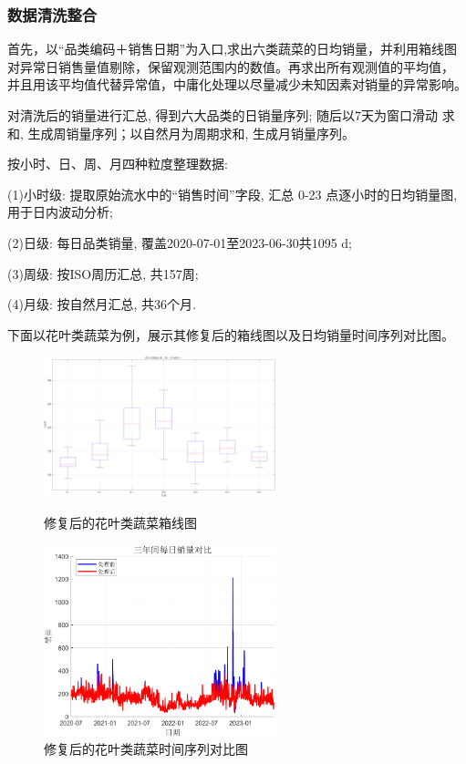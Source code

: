 \documentclass{cumcmthesis}
\begin{document}
\subsubsection{数据清洗整合}

首先，以“品类编码＋销售日期”为入口,求出六类蔬菜的日均销量，并利用箱线图
对异常日销售量值剔除，保留观测范围内的数值。再求出所有观测值的平均值，
并且用该平均值代替异常值，中庸化处理以尽量减少未知因素对销量的异常影响。

对清洗后的销量进行汇总, 得到六大品类的日销量序列; 随后以7天为窗口滑动
求和, 生成周销量序列；以自然月为周期求和, 生成月销量序列。  

按小时、日、周、月四种粒度整理数据: 

(1)小时级: 提取原始流水中的“销售时间”字段, 汇总 0-23 点逐小时的日均销量图,  用于日内波动分析; 

(2)日级: 每日品类销量, 覆盖2020-07-01至2023-06-30共1095 d;   

(3)周级: 按ISO周历汇总, 共157周;   

(4)月级: 按自然月汇总, 共36个月. 

下面以花叶类蔬菜为例，展示其修复后的箱线图以及日均销量时间序列对比图。

\begin{figure}[H]
    \centering
    \includegraphics[width=0.6\textwidth]{修复后的花叶类蔬菜箱线图.png} 

    \caption{修复后的花叶类蔬菜箱线图}
    
    \includegraphics[width=0.6\textwidth]{日均销量时间序列对比图}

    \caption{修复后的花叶类蔬菜时间序列对比图}

\end{figure}
\end{document}
